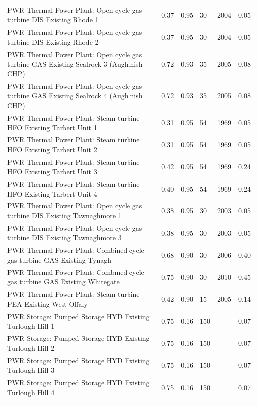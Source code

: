 \documentclass[gmd,manuscript]{copernicus}
\begin{document}
\begin{center}
\begin{longtable}{p{22em}lllll}
PWR Thermal Power Plant: Open cycle gas turbine DIS Existing Rhode 1 & 0.37 & 0.95 & 30 & 2004 & 0.05 \\
PWR Thermal Power Plant: Open cycle gas turbine DIS Existing Rhode 2 & 0.37 & 0.95 & 30 & 2004 & 0.05 \\
PWR Thermal Power Plant: Open cycle gas turbine GAS Existing Sealrock 3 (Aughinish CHP) & 0.72 & 0.93 & 35 & 2005 & 0.08 \\
PWR Thermal Power Plant: Open cycle gas turbine GAS Existing Sealrock 4 (Aughinish CHP) & 0.72 & 0.93 & 35 & 2005 & 0.08 \\
PWR Thermal Power Plant: Steam turbine HFO Existing Tarbert Unit 1 & 0.31 & 0.95 & 54 & 1969 & 0.05 \\
PWR Thermal Power Plant: Steam turbine HFO Existing Tarbert Unit 2 & 0.31 & 0.95 & 54 & 1969 & 0.05 \\
PWR Thermal Power Plant: Steam turbine HFO Existing Tarbert Unit 3 & 0.42 & 0.95 & 54 & 1969 & 0.24 \\
PWR Thermal Power Plant: Steam turbine HFO Existing Tarbert Unit 4 & 0.40 & 0.95 & 54 & 1969 & 0.24 \\
PWR Thermal Power Plant: Open cycle gas turbine DIS Existing Tawnaghmore 1 & 0.38 & 0.95 & 30 & 2003 & 0.05 \\
PWR Thermal Power Plant: Open cycle gas turbine DIS Existing Tawnaghmore 3 & 0.38 & 0.95 & 30 & 2003 & 0.05 \\
PWR Thermal Power Plant: Combined cycle gas turbine GAS Existing Tynagh & 0.68 & 0.90 & 30 & 2006 & 0.40 \\
PWR Thermal Power Plant: Combined cycle gas turbine GAS Existing Whitegate & 0.75 & 0.90 & 30 & 2010 & 0.45 \\
PWR Thermal Power Plant: Steam turbine PEA Existing West Offaly & 0.42 & 0.90 & 15 & 2005 & 0.14 \\
PWR Storage: Pumped Storage HYD Existing Turlough Hill 1 & 0.75 & 0.16 & 150 & & 0.07 \\
PWR Storage: Pumped Storage HYD Existing Turlough Hill 2 & 0.75 & 0.16 & 150 & & 0.07 \\
PWR Storage: Pumped Storage HYD Existing Turlough Hill 3 & 0.75 & 0.16 & 150 & & 0.07 \\
PWR Storage: Pumped Storage HYD Existing Turlough Hill 4 & 0.75 & 0.16 & 150 & & 0.07 \\ \hline

\label{base year generation units}
\end{longtable}
\end{center}
\end{document}
